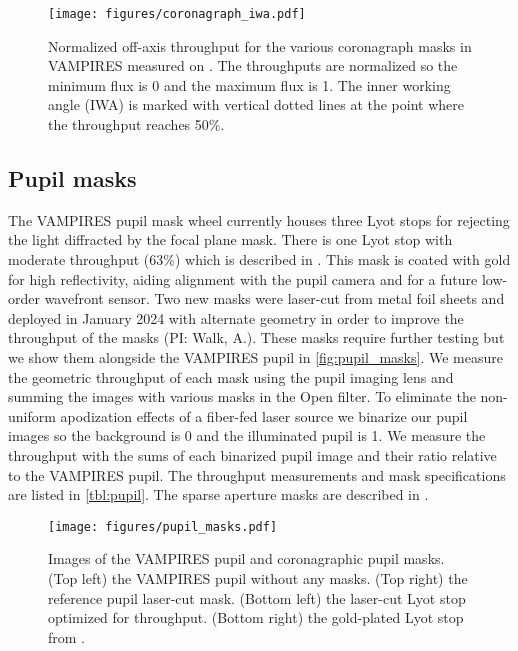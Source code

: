 \begin{figure}
    \centering
    \texttt{[image: figures/coronagraph\_iwa.pdf]}
    \caption{Normalized off-axis throughput for the various coronagraph masks in VAMPIRES measured on . The throughputs are normalized so the minimum flux is 0 and the maximum flux is 1. The inner working angle (IWA) is marked with vertical dotted lines at the point where the throughput reaches 50\%.\label{fig:iwa}}
\end{figure}

\subsection{Pupil masks}

The VAMPIRES pupil mask wheel currently houses three Lyot stops for rejecting the light diffracted by the focal plane mask. There is one Lyot stop with moderate throughput (63\%) which is described in \citet{lucas_visible-light_2022}. This mask is coated with gold for high reflectivity, aiding alignment with the pupil camera and for a future low-order wavefront sensor. Two new masks were laser-cut from metal foil sheets and deployed in January 2024 with alternate geometry in order to improve the throughput of the masks (PI: Walk, A.). These masks require further testing but we show them alongside the VAMPIRES pupil in \autoref{fig:pupil_masks}. We measure the geometric throughput of each mask using the pupil imaging lens and summing the images with various masks in the Open filter. To eliminate the non-uniform apodization effects of a fiber-fed laser source we binarize our pupil images so the background is 0 and the illuminated pupil is 1. We measure the throughput with the sums of each binarized pupil image and their ratio relative to the VAMPIRES pupil. The throughput measurements and mask specifications are listed in \autoref{tbl:pupil}. The sparse aperture masks are described in \citep{norris_vampires_2015}. 


\begin{figure}
    \centering
    \texttt{[image: figures/pupil\_masks.pdf]}
    \caption{Images of the VAMPIRES pupil and coronagraphic pupil masks. (Top left) the VAMPIRES pupil without any masks. (Top right) the reference pupil laser-cut mask. (Bottom left) the laser-cut Lyot stop optimized for throughput. (Bottom right) the gold-plated Lyot stop from \citep{lucas_visible-light_2022}.\label{fig:pupil_masks}}
\end{figure}


